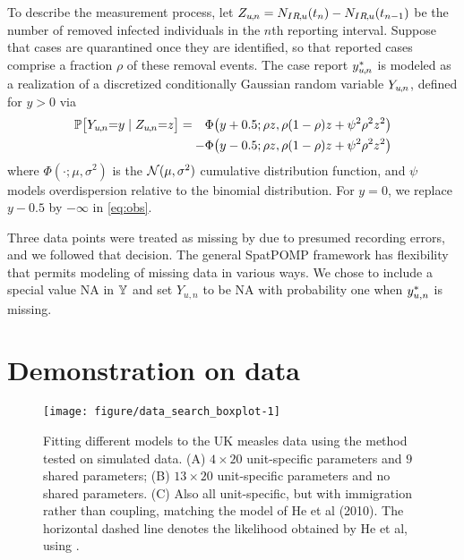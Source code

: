 \documentclass[12pt]{article}\usepackage[]{graphicx}\usepackage[]{xcolor}
\newenvironment{knitrout}{}{} %
\begin{document}
To describe the measurement process, let $Z_{u{\hspace{-0.25mm},\hspace{-0.2mm}}n}=N_{IR{\hspace{-0.25mm},\hspace{-0.2mm}}u}(t_n)-N_{IR{\hspace{-0.25mm},\hspace{-0.2mm}}u}(t_{n-1})$ be the number of removed infected individuals in the $n$th reporting interval.
Suppose that cases are quarantined once they are identified, so that reported cases comprise a fraction $\rho$ of these removal events.
The case report $y^*_{u{\hspace{-0.25mm},\hspace{-0.2mm}}n}$ is modeled as a realization of a discretized conditionally Gaussian random variable $Y_{u{\hspace{-0.25mm},\hspace{-0.2mm}}n}$, defined for $y>0$ via
\begin{eqnarray}
\nonumber
\prob\big[Y_{\unit\comma\time}{=}y\mid Z_{\unit\comma\time}{=}z\big] &=& \Phi\big(y+0.5; \rho z,\rho(1-\rho)z+\psi^2\rho^2z^2\big)
\\
&&\hspace{-20mm}
- \Phi\big(y-0.5; \rho z,\rho(1-\rho)z+\psi^2\rho^2z^2\big)
\label{eq:obs}
\end{eqnarray}
where $\Phi(\cdot;\mu,\sigma^2)$ is the $\mathcal{N}(\mu,\sigma^2)$ cumulative distribution function, and $\psi$ models overdispersion relative to the binomial distribution.
For $y=0$, we replace $y-0.5$ by $-\infty$ in \eqref{eq:obs}.

Three data points were treated as missing by \citet{he10} due to presumed recording errors, and we followed that decision.
The general SpatPOMP framework has flexibility that permits modeling of missing data in various ways. 
We chose to include a special value $\mathrm{NA}$ in ${\mathbb Y}$ and set $Y_{u,n}$ to be $\mathrm{NA}$ with probability one when $y^*_{u,n}$ is missing.

\section{Demonstration on data}
\label{sec:data}

\begin{knitrout}
\color{fgcolor}\begin{figure}

\texttt{[image: figure/data\_search\_boxplot-1]} \hfill{}

\caption[Fitting different models to the UK measles data using the method tested on simulated data]{Fitting different models to the UK measles data using the method tested on simulated data. (A) $4\times 20$ unit-specific parameters and $9$ shared parameters; (B) $13\times 20$ unit-specific parameters and no shared parameters. (C) Also all unit-specific, but with immigration rather than coupling, matching the model of He et al (2010). The horizontal dashed line denotes the likelihood obtained by He et al, using .}\label{fig:data_search_boxplot}
\end{figure}

\end{knitrout}
\end{document}
